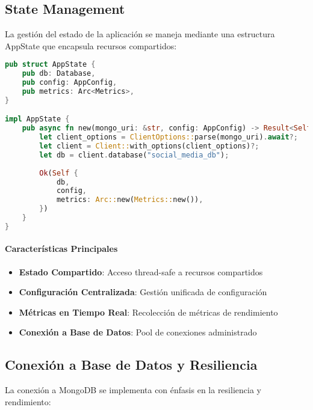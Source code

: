 \documentclass[12pt,letterpaper]{article}
\begin{document}
\subsection{State Management}
La gestión del estado de la aplicación se maneja mediante una estructura AppState que encapsula recursos compartidos:

\begin{lstlisting}[language=rust]
pub struct AppState {
    pub db: Database,
    pub config: AppConfig,
    pub metrics: Arc<Metrics>,
}

impl AppState {
    pub async fn new(mongo_uri: &str, config: AppConfig) -> Result<Self, AppError> {
        let client_options = ClientOptions::parse(mongo_uri).await?;
        let client = Client::with_options(client_options)?;
        let db = client.database("social_media_db");
        
        Ok(Self {
            db,
            config,
            metrics: Arc::new(Metrics::new()),
        })
    }
}
\end{lstlisting}

\paragraph{Características Principales}
\begin{itemize}
    \item \textbf{Estado Compartido}: Acceso thread-safe a recursos compartidos
    \item \textbf{Configuración Centralizada}: Gestión unificada de configuración
    \item \textbf{Métricas en Tiempo Real}: Recolección de métricas de rendimiento
    \item \textbf{Conexión a Base de Datos}: Pool de conexiones administrado
\end{itemize}

\subsection{Conexión a Base de Datos y Resiliencia}
La conexión a MongoDB se implementa con énfasis en la resiliencia y rendimiento:
\end{document}
